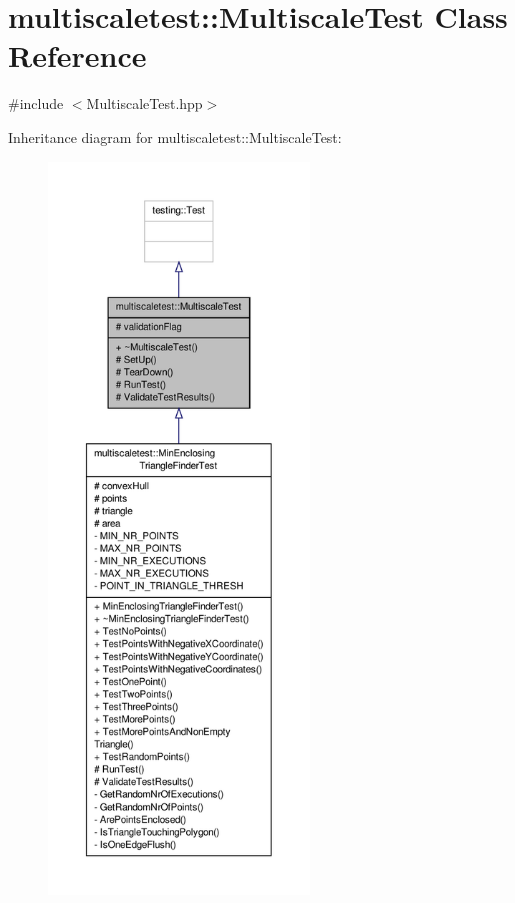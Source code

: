 \hypertarget{classmultiscaletest_1_1MultiscaleTest}{\section{multiscaletest\-:\-:Multiscale\-Test Class Reference}
\label{classmultiscaletest_1_1MultiscaleTest}
}


{\ttfamily \#include $<$Multiscale\-Test.\-hpp$>$}



Inheritance diagram for multiscaletest\-:\-:Multiscale\-Test\-:\nopagebreak
\begin{figure}[H]
\begin{center}
\leavevmode
\includegraphics[height=550pt]{classmultiscaletest_1_1MultiscaleTest__inherit__graph}
\end{center}
\end{figure}


